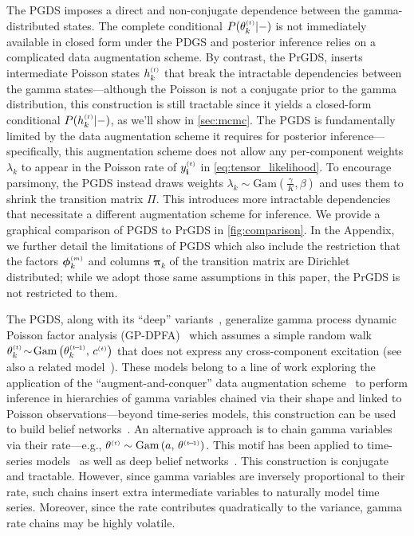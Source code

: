\documentclass{article}
\begin{document}
The PGDS imposes a direct and non-conjugate dependence between the gamma-distributed states. The complete conditional $P(\thetakt | -)$ is not immediately available in closed form under the PDGS and posterior inference relies on a complicated data augmentation scheme. By contrast, the PrGDS, inserts intermediate Poisson states $\hkt$ that break the intractable dependencies between the gamma states---although the Poisson is not a conjugate prior to the gamma distribution, this construction is still tractable since it yields a closed-form conditional $P(\hkt | -)$, as we'll show in \cref{sec:mcmc}. The PGDS is fundamentally limited by the data augmentation scheme it requires for posterior inference---specifically, this augmentation scheme does not allow any per-component weights $\lambda_k$ to appear in the Poisson rate of $\ydt$ in \cref{eq:tensor_likelihood}. To encourage parsimony, the PGDS instead draws weights $\lambda_k \sim \textrm{Gam}(\tfrac{\gamma}{K}, \beta)$ and uses them to shrink the transition matrix $\Pi$. This introduces more intractable dependencies that necessitate a different augmentation scheme for inference. We provide a graphical comparison of PGDS to PrGDS in \cref{fig:comparison}. In the Appendix, we further detail the limitations of PGDS which also include the restriction that the factors $\boldsymbol{\phi}_k^{\mathsmaller{(m)}}$ and columns $\boldsymbol{\pi}_k$ of the transition matrix are Dirichlet distributed; while we adopt those same assumptions in this paper, the PrGDS is not restricted to them.~

The PGDS, along with its ``deep'' variants~\cite{gong2017deep,guo2018deep}, generalize gamma process dynamic Poisson factor analysis (GP-DPFA)~\citep{acharya2015nonparametric} which assumes a simple random walk $\thetakt \tsim \Gam{\theta^{\mathsmaller{(t \tm 1)}}_k,\, c^{\mathsmaller{(t)}}}$ that does not express any cross-component excitation (see also a related model~\cite{yang2018dependent}). These models belong to a line of work exploring the application of the ``augment-and-conquer'' data augmentation scheme~\cite{zhou2012augment-and-conquer} to perform inference in hierarchies of gamma variables chained via their shape and linked to Poisson observations---beyond time-series models, this construction can be used to build belief networks~\cite{zhou2015poisson}. An alternative approach is to chain gamma variables via their rate---e.g., $\theta^{\mathsmaller{(t)}} \sim \Gam{a,\,\theta^{\mathsmaller{(t\tm 1)}}}$. This motif has been applied to time-series models~\cite{cemgil2007conjugate,jerfel2016dynamic} as well as deep belief networks~\cite{ranganath2015deep}. This construction is conjugate and tractable. However, since gamma variables are inversely proportional to their rate, such chains insert extra intermediate variables to naturally model time series. Moreover, since the rate contributes quadratically to the variance, gamma rate chains may be highly volatile.~
\end{document}
